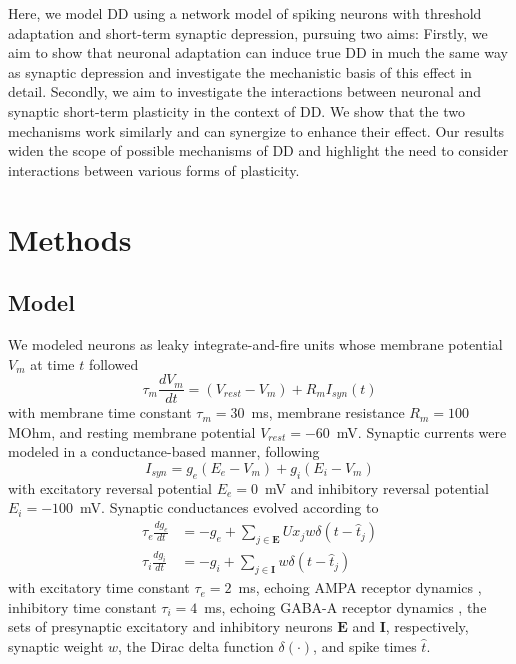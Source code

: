 \documentclass[9pt,lineno,onehalfspacing]{elife}
\begin{document}
Here, we model DD using a network model of spiking neurons with threshold adaptation and short-term synaptic depression, pursuing two aims: Firstly, we aim to show that neuronal adaptation can induce true DD in much the same way as synaptic depression and investigate the mechanistic basis of this effect in detail. Secondly, we aim to investigate the interactions between neuronal and synaptic short-term plasticity in the context of DD. We show that the two mechanisms work similarly and can synergize to enhance their effect. Our results widen the scope of possible mechanisms of DD and highlight the need to consider interactions between various forms of plasticity.

\section{Methods}\label{sec:methods}

\subsection{Model}\label{sec:model}

We modeled neurons as leaky integrate-and-fire units whose membrane potential $V_m$ at time $t$ followed
\begin{equation}
    \tau_m \frac{dV_m}{dt} = (V_{rest}-V_m) + R_m I_{syn}(t)
\end{equation}
with membrane time constant $\tau_m = 30$~ms, membrane resistance $R_m = 100$ MOhm, and resting membrane potential $V_{rest} = -60$~mV. Synaptic currents were modeled in a conductance-based manner, following
\begin{equation}
    I_{syn} = g_e(E_e-V_m) + g_i(E_i-V_m)
\end{equation}
with excitatory reversal potential $E_e = 0$~mV and inhibitory reversal potential $E_i = -100$~mV. Synaptic conductances evolved according to
\begin{align} 
    \tau_e \frac{dg_e}{dt} &= -g_e + \sum_{j \in \boldsymbol E} U x_j w \delta(t - \hat{t}_j) \nonumber \\
    \tau_i \frac{dg_i}{dt} &= -g_i + \sum_{j \in \boldsymbol I} w \delta(t - \hat{t}_j) \label{eq:gsyn}
\end{align}
with excitatory time constant $\tau_e = 2$~ms, echoing AMPA receptor dynamics \citep{Hausser1997-cn}, inhibitory time constant $\tau_i = 4$~ms, echoing GABA-A receptor dynamics \citep{Destexhe1994-oc}, the sets of presynaptic excitatory and inhibitory neurons $\boldsymbol E$ and $\boldsymbol I$, respectively, synaptic weight $w$, the Dirac delta function $\delta(\cdot)$, and spike times $\hat{t}$.
\end{document}
